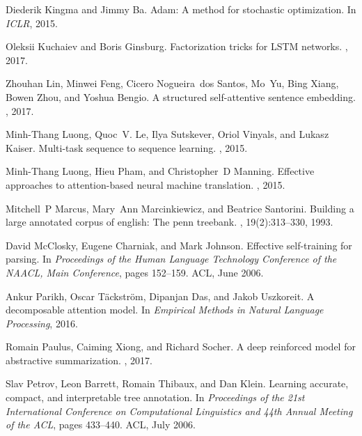 \documentclass{article}
\begin{document}
\begin{thebibliography}{10}
Diederik Kingma and Jimmy Ba.
\newblock Adam: A method for stochastic optimization.
\newblock In {\em ICLR}, 2015.

Oleksii Kuchaiev and Boris Ginsburg.
\newblock Factorization tricks for {LSTM} networks.
, 2017.

Zhouhan Lin, Minwei Feng, Cicero Nogueira~dos Santos, Mo~Yu, Bing Xiang, Bowen
  Zhou, and Yoshua Bengio.
\newblock A structured self-attentive sentence embedding.
, 2017.

Minh-Thang Luong, Quoc~V. Le, Ilya Sutskever, Oriol Vinyals, and Lukasz Kaiser.
\newblock Multi-task sequence to sequence learning.
, 2015.

Minh-Thang Luong, Hieu Pham, and Christopher~D Manning.
\newblock Effective approaches to attention-based neural machine translation.
, 2015.

Mitchell~P Marcus, Mary~Ann Marcinkiewicz, and Beatrice Santorini.
\newblock Building a large annotated corpus of english: The penn treebank.
, 19(2):313--330, 1993.

David McClosky, Eugene Charniak, and Mark Johnson.
\newblock Effective self-training for parsing.
\newblock In {\em Proceedings of the Human Language Technology Conference of
  the NAACL, Main Conference}, pages 152--159. ACL, June 2006.

Ankur Parikh, Oscar Täckström, Dipanjan Das, and Jakob Uszkoreit.
\newblock A decomposable attention model.
\newblock In {\em Empirical Methods in Natural Language Processing}, 2016.

Romain Paulus, Caiming Xiong, and Richard Socher.
\newblock A deep reinforced model for abstractive summarization.
, 2017.

Slav Petrov, Leon Barrett, Romain Thibaux, and Dan Klein.
\newblock Learning accurate, compact, and interpretable tree annotation.
\newblock In {\em Proceedings of the 21st International Conference on
  Computational Linguistics and 44th Annual Meeting of the ACL}, pages
  433--440. ACL, July 2006.


\end{thebibliography}
\end{document}
